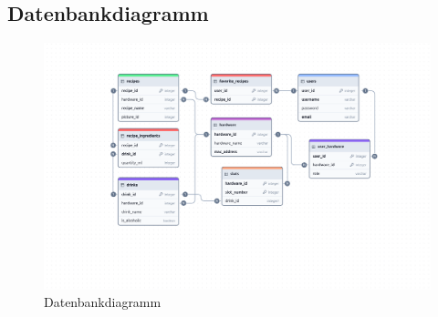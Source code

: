 \newpage
\subsection{Datenbankdiagramm}

\begin{figure}[H]
  \centering
\includegraphics[height=0.96\textwidth, angle=270]{graphics/schemes/postgres_db_scheme.png}
  \caption{Datenbankdiagramm}
  \label{fig:database_diagram}
\end{figure}

